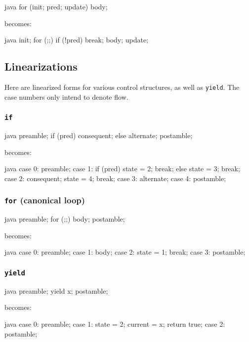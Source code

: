 \documentclass[journal,a4paper]{IEEEtran}
\begin{document}
\begin{pygmented}{java}
for (init; pred; update) {
    body;
}
\end{pygmented}

becomes:

\begin{pygmented}{java}
{
    init;
    for (;;) {
        if (!pred) break;
        body;
        update;
    }
}
\end{pygmented}

\subsection{Linearizations} \label{appendix:linearizations}

Here are linearized forms for various control structures, as well as \texttt{yield}. The case
numbers only intend to denote flow.

\subsubsection{\texttt{if}}

\begin{pygmented}{java}
preamble;
if (pred) {
    consequent;
} else {
    alternate;
}
postamble;
\end{pygmented}

becomes:

\begin{pygmented}{java}
case 0:
    preamble;
case 1:
    if (pred) {
        state = 2;
        break;
    } else {
        state = 3;
        break;
    }
case 2:
    consequent;
    state = 4;
    break;
case 3:
    alternate;
case 4:
    postamble;
\end{pygmented}

\subsubsection{\texttt{for} (canonical loop)}

\begin{pygmented}{java}
preamble;
for (;;) {
    body;
}
postamble;
\end{pygmented}

becomes:

\begin{pygmented}{java}
case 0:
    preamble;
case 1:
    body;
case 2:
    state = 1;
    break;
case 3:
    postamble;
\end{pygmented}

\subsubsection{\texttt{yield}}

\begin{pygmented}{java}
preamble;
yield x;
postamble;
\end{pygmented}

becomes:

\begin{pygmented}{java}
case 0:
    preamble;
case 1:
    state = 2;
    current = x;
    return true;
case 2:
    postamble;
\end{pygmented}
\end{document}
